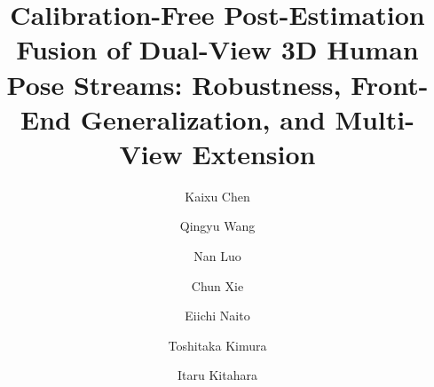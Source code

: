 \documentclass[preprint,12pt]{elsarticle}
\begin{document}
\begin{frontmatter}

\title{Calibration-Free Post-Estimation Fusion of Dual-View 3D Human Pose Streams: Robustness, Front-End Generalization, and Multi-View Extension}

\author[ccs]{Kaixu Chen}
\author[imiss]{Qingyu Wang}
\author[imiss]{Nan Luo}
\author[ccs]{Chun Xie}
\author[nict]{Eiichi Naito}
\author[ntt]{Toshitaka Kimura}
\author[ccs]{Itaru Kitahara}

\address[ccs]{Center for Computational Sciences, University of Tsukuba, Tsukuba, Ibaraki, Japan}
\address[imiss]{Intelligent and Mechanical Interaction Systems, University of Tsukuba, Tsukuba, Ibaraki, Japan}
\address[nict]{Advanced ICT Research Institute, National Institute of Information and Communications Technology, Osaka, Japan}
\address[ntt]{NTT Communication Science Laboratories, Tokyo, Japan}


\end{frontmatter}
\end{document}
